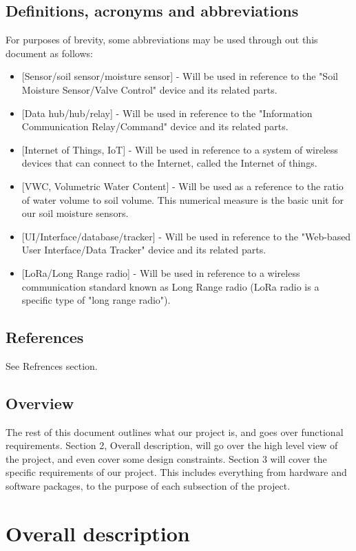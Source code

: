 \documentclass[onecolumn, draftclsnofoot,10pt, compsoc]{IEEEtran}
\begin{document}
	\subsection{Definitions, acronyms and abbreviations}
	For purposes of brevity, some abbreviations may be used through out this document as follows:
	\begin{itemize}
		\item{[Sensor/soil sensor/moisture sensor] - Will be used in reference to the "Soil Moisture Sensor/Valve Control" device and its related parts.}
		\item{[Data hub/hub/relay] - Will be used in reference to the "Information Communication Relay/Command" device and its related parts.}
		
		\item{[Internet of Things, IoT] - Will be used in reference to a system of wireless devices that can connect to the Internet, called the Internet of things.}
		\item{[VWC, Volumetric Water Content] - Will be used as a reference to the ratio of water volume to soil volume. This numerical measure is the basic unit for our soil moisture sensors.}
		\item{[UI/Interface/database/tracker] - Will be used in reference to the "Web-based User Interface/Data Tracker" device and its related parts.}
		\item{[LoRa/Long Range radio] - Will be used in reference to a wireless communication standard known as Long Range radio (LoRa radio is a specific type of "long range radio").}
	\end{itemize}
	\subsection{References}
	See Refrences section.
	\subsection{Overview}
	The rest of this document outlines what our project is, and goes over functional requirements.
	Section 2, Overall description, will go over the high level view of the project, and even cover some design constraints. 
	Section 3 will cover the specific requirements of our project. 
	This includes everything from hardware and software packages, to the purpose of each subsection of the project. 
	
	
	\section{Overall description}
\end{document}
